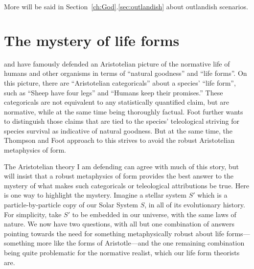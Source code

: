 More will be said in Section~\ref{ch:God}.\ref{sec:outlandish} about outlandish scenarios.

\section{The mystery of life forms}\label{sec:life-forms}
 and  have famously defended an Aristotelian picture of the 
normative life
of humans and other organisms in terms of ``natural goodness'' and ``life forms''. On this picture, there are
``Aristotelian categoricals'' about a species' ``life form'', such as ``Sheep have four legs'' and ``Humans keep
their promises.'' These categoricals are not equivalent to any statistically quantified claim, but are
normative, while at the same time being thoroughly factual. Foot further wants to distinguish those claims
that are tied to the species' teleological striving for species survival as indicative of natural goodness.
But at the same time, the Thompson and Foot approach to this strives to avoid the robust Aristotelian metaphysics
of form. 

The Aristotelian theory I am defending can agree with much of this story, but will insist that a robust metaphysics of
form provides the best answer to the mystery of what makes such categoricals or teleological attributions be true.
Here is one way to highlight the mystery. Imagine a stellar system $S'$ which is a particle-by-particle copy of our
Solar System $S$, in all of its evolutionary history. For simplicity, take $S'$ to be embedded in our universe, with the same laws of nature. We now 
have two questions, with all but one combination of answers pointing towards the need for something 
metaphysically robust about life forms---something more like the forms of Aristotle---and the one remaining
combination being quite problematic for the normative realist, which our life form theorists are.

